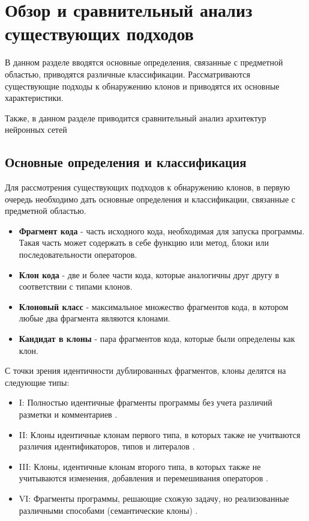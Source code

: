 \chapter{Обзор и сравнительный анализ существующих подходов}
В данном разделе вводятся основные определения, связанные с предметной областью, приводятся различные классификации. Рассматриваются существующие подходы к обнаружению клонов и приводятся их основные характеристики.

Также, в данном разделе приводится сравнительный анализ архитектур нейронных сетей
\section{Основные определения и классификация}

Для рассмотрения существующих подходов к обнаружению клонов, в первую очередь необходимо дать основные определения и классификации, связанные с предметной областью. 

\begin{itemize}
\setlength\itemsep{0mm}
\item \textbf{Фрагмент кода} - часть исходного кода, необходимая для запуска программы. Такая часть может содержать в себе функцию или метод, блоки или последовательности операторов.
\item \textbf{Клон кода} - две и более части кода, которые аналогичны друг другу в соответствии с типами клонов.
\item \textbf{Клоновый класс} - максимальное множество фрагментов кода, в котором любые два фрагмента являются клонами.
\item \textbf{Кандидат в клоны} - пара фрагментов кода, которые были определены как клон.
\end{itemize}

С точки зрения идентичности дублированных фрагментов, клоны делятся на следующие типы:
\begin{itemize}
\setlength\itemsep{0mm}
\item I: Полностью идентичные фрагменты программы без учета различий разметки и комментариев \cite{surveyroyandcordy} \cite{akhinitsykson}.
\item II: Клоны идентичные клонам первого типа, в которых также не учитваются различия идентификаторов, типов и литералов \cite{surveyroyandcordy} \cite{akhinitsykson}.
\item III: Клоны, идентичные клонам второго типа, в которых также не учитываются изменения, добавления и перемешивания операторов \cite{surveyroyandcordy} \cite{akhinitsykson}.
\item VI: Фрагменты программы, решающие схожую задачу, но реализованные различными способами (семантические клоны) \cite{surveyroyandcordy} \cite{akhinitsykson}.
\end{itemize}

